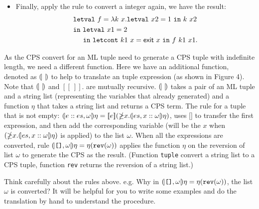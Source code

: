 \documentclass{article}
\theoremstyle{definition}
\theoremstyle{remark}
\numberwithin{equation}{section}
\begin{document}
\begin{itemize}
\item Finally, apply the rule to convert a integer again, we have the result:
\begin{align*}
  &\texttt{letval}\ f=\lambda k\ x.\texttt{letval}\ x2=1\ \texttt{in}\ k\ x2\\
     &\texttt{in}\ \texttt{letval}\ x1=2\\
   &\kern0.5cm \texttt{in}\ \texttt{letcont}\ k1\ x=
    \textsf{exit}\ x\ \texttt{in}\ f\ k1\ x1.
\end{align*}
\end{itemize}

As the CPS convert for an ML tuple need to generate
 a CPS tuple with indefinite length, we need a different function.
 Here we have an additional function, denoted as $\round{\ }$ to help to
 translate an tuple expression (as shown in Figure 4). Note that
  $\round{\ }$  and $[\![\ ]\!]$.
 are mutually recursive. $\round{\ }$ takes a pair of an ML tuple and
 a string list (representing the variables that already generated) and a
 function $\eta$ that takes a string list and returns a CPS term.
The rule for a tuple that is not empty: $(\!|e::es, \omega|\!)\eta
       =[\![e]\!](\mathbb{\Lambda}x.
          (\!|es,x::\omega|\!)\eta )$,
uses [\![$e$]\!] to transfer the first expression, and then add the
corresponding variable (will be the $x$ when $(\mathbb{\Lambda}x.
          (\!|es,x::\omega|\!)\eta )$ is applied) to the list $\omega$.
When all the expressions are converted, rule $(\!|\texttt{[]}, \omega|\!)\eta
        =\eta (\texttt{rev} (\omega))$ applies the function $\eta$
        on the reversion of list $\omega$ to generate the CPS as the result.
(Function \texttt{tuple} convert a string list to a CPS tuple, function
\texttt{rev} returns the reversion of a string list.)

Think carefully about the rules above. e.g. Why in $(\!|\texttt{[]}, \omega|\!)\eta
        =\eta (\texttt{rev} (\omega))$, the list $\omega$ is converted?
It will be helpful for you to write some examples and do the translation
by hand to understand
the procedure.\\

\\
\end{document}
